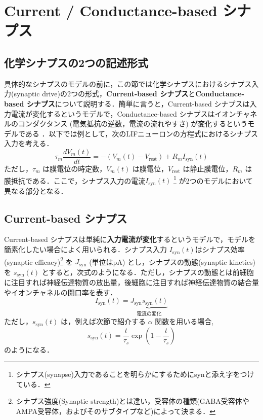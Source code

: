 \section{Current / Conductance-based シナプス
}
\subsection{化学シナプスの2つの記述形式
}
具体的なシナプスのモデルの前に，この節では化学シナプスにおけるシナプス入力(synaptic drive)の2つの形式，\textbf{Current-based シナプス}と\textbf{Conductance-based シナプス}について説明する．簡単に言うと，Current-based シナプスは入力電流が変化するというモデルで，Conductance-based シナプスはイオンチャネルのコンダクタンス (電気抵抗の逆数，電流の流れやすさ) が変化するというモデルである \citep{Cavallari2014-jx}．以下では例として，次のLIFニューロンの方程式におけるシナプス入力を考える．
\begin{equation}
\tau_m \frac{dV_{m}(t)}{dt}=-(V_{m}(t)-V_\text{rest})+R_m I_{\text{syn}}(t)    
\end{equation}
ただし，$\tau_m$ は膜電位の時定数，$V_m(t)$ は膜電位，$V_\text{rest}$ は静止膜電位，$R_m$ は膜抵抗である．ここで，シナプス入力の電流$I_{\text{syn}}(t)$ \footnote{シナプス(synapse)入力であることを明らかにするためにsynと添え字をつけている．} が2つのモデルにおいて異なる部分となる．
\subsection{Current-based シナプス
}
Current-based シナプスは単純に\textbf{入力電流が変化}するというモデルで，モデルを簡素化したい場合によく用いられる．シナプス入力 $I_{\text{syn}}(t)$はシナプス効率(synaptic efficacy)\footnote{シナプス強度(Synaptic strength)とは違い，受容体の種類(GABA受容体やAMPA受容体，およびそのサブタイプなど)によって決まる．} を $J_{\text{syn}}$ (単位はpA) とし，シナプスの動態(synaptic kinetics)を $s_{\text{syn}}(t)$ とすると，次式のようになる．ただし，シナプスの動態とは前細胞に注目すれば神経伝達物質の放出量，後細胞に注目すれば神経伝達物質の結合量やイオンチャネルの開口率を表す．
\begin{equation}
I_{\text{syn}}(t)=\underbrace{J_{\text{syn}}s_{\text{syn}}(t)}_{電流の変化}    
\end{equation}
ただし，$s_{\text{syn}}(t)$ は，例えば次節で紹介する $\alpha$ 関数を用いる場合, 
\begin{equation}
s_{\text{syn}}(t)=\dfrac{t}{\tau_s} \exp \left(1-\dfrac{t}{\tau_s}\right)    
\end{equation}
のようになる．
